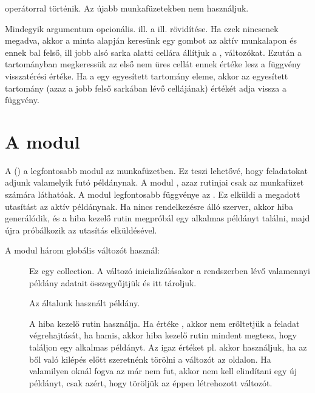 \begin{description}
  operátorral történik. Az újabb munkafüzetekben nem használjuk.
\item[\code{GetCmd(caption = "*", brc As range, tlc As range)}] Mindegyik
  argumentum opcionális.  ill.  a 
  ill.  rövidítése. Ha ezek nincsenek megadva, akkor a
   minta alapján keresünk egy gombot az aktív munkalapon és
  ennek bal felső, ill jobb alsó sarka alatti cellára állítjuk a ,
   változókat. Ezután a  tartományban
  megkeressük az első
  nem üres cellát ennek értéke lesz a függvény visszatérési
  értéke. Ha a  egy egyesített tartomány eleme, akkor az egyesített
  tartomány (azaz a jobb felső sarkában lévő cellájának) értékét adja
  vissza a függvény. 
\end{description}

\section{A  modul}\label{sec:5.4}

A  () a legfontosabb modul az
 munkafüzetben. Ez teszi lehetővé, hogy feladatokat
adjunk valamelyik futó  példánynak. A modul , azaz 
rutinjai csak az  munkafüzet számára láthatóak. A modul
legfontosabb függvénye az 
. Ez elküldi a megadott utasítást az aktív 
példánynak. Ha nincs rendelkezésre álló  szerver, akkor hiba
generálódik, és a hiba kezelő rutin megpróbál egy alkalmas  
példányt találni, majd újra próbálkozik az utasítás elküldésével.

A modul három globális változót használ:
\begin{description}
\item[] Ez egy  collection. A változó
  inicializálásakor a 
  rendszerben lévő valamennyi   példány adatait összegyűjtjük és itt
  tároljuk.
\item[] Az általunk használt  példány. 
\item[] A
  hiba kezelő rutin használja. Ha értéke , akkor nem erőltetjük a
  feladat  végrehajtását, ha hamis, akkor hiba kezelő rutin mindent
  megtesz, hogy találjon egy  alkalmas  példányt. Az igaz értéket
  pl. akkor használjuk, ha az ből való kilépés előtt
  szeretnénk törölni a  változót az  oldalon. Ha valamilyen
  oknál fogva az  már nem fut, akkor nem kell elindítani egy új
  példányt, csak azért, hogy töröljük az éppen létrehozott 
  változót.
\end{description}

